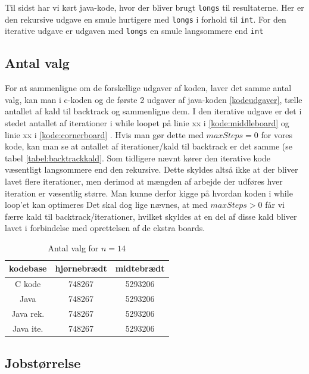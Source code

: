 Til sidst har vi kørt java-kode, hvor der bliver brugt \texttt{longs} til
resultaterne. Her er den rekursive udgave en smule hurtigere med \texttt{longs}
i forhold til \texttt{int}. For den iterative udgave er udgaven med
\texttt{longs} en smule langsommere end \texttt{int} 

\subsection{Antal valg}

For at sammenligne om de forskellige udgaver af koden, laver det samme antal
valg, kan man i c-koden og de første 2 udgaver af java-koden
\ref{kodeudgaver}, tælle antallet af kald til backtrack og sammenligne dem.  I
den iterative udgave er det i stedet antallet af iterationer i while loopet på
linie xx i \ref{kode:middleboard} og linie xx i \ref{kode:cornerboard}
. Hvis man gør dette med $maxSteps=0$ for vores kode,
kan man se at antallet af iterationer/kald til backtrack er det samme (se tabel
\ref{tabel:backtrackkald}. Som tidligere nævnt kører den iterative kode
væsentligt langsommere end den rekursive. Dette skyldes altså ikke at der bliver
lavet flere iterationer, men derimod at mængden af arbejde der udføres hver
iteration er væsentlig større. Man kunne derfor kigge på hvordan koden i while
loop'et kan optimeres Det skal dog lige nævnes, at med $maxSteps>0$ får vi færre
kald til backtrack/iterationer, hvilket skyldes at en del af disse kald bliver
lavet i forbindelse med oprettelsen af de ekstra boards. 

\begin{table}
\begin{center}
\begin{tabular}{|c|c|c|}
\hline kodebase  & hjørnebrædt & midtebrædt \\
\hline C kode    &  748267           &  5293206           \\
\hline Java      &  748267           &  5293206           \\
\hline Java rek. &  748267           &  5293206           \\
\hline Java ite. &  748267           &  5293206           \\
\hline
\end{tabular}
\caption{Antal valg for $n=14$}
\label{table:backtrackkald}
\end{center}
\end{table}

\subsection{Jobstørrelse}

